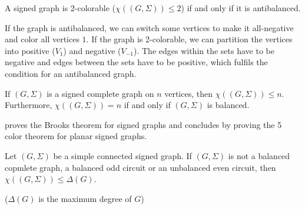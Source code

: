 \begin{proposition}[Máčajová et. al.]
    A signed graph is 2-colorable ($\chi ((G, \Sigma)) \leq 2$) if and only if it is antibalanced.
\end{proposition}

If the graph is antibalanced, we can switch some vertices to make it all-negative and color all vertices $1$.
If the graph is 2-colorable, we can partition the vertices into positive ($V_1$) and negative ($V_{-1}$).
The edges within the sets have to be negative and edges between the sets have to be positive, which fulfils the condition for an antibalanced graph.

\begin{proposition}
    If $(G, \Sigma)$ is a signed complete graph on $n$ vertices, then $\chi ((G, \Sigma)) \leq n$. 
    Furthermore, $\chi ((G, \Sigma)) = n$ if and only if $(G, \Sigma)$ is balanced.
\end{proposition}

\cite{chromatic-number} proves the Brooks theorem\cite{brooks} for signed graphs and concludes by proving the 5 color theorem for planar signed graphs.

\begin{theorem}
    Let $(G, \Sigma)$ be a simple connected signed graph. If $(G, \Sigma)$ is not a balanced copmlete graph,
    a balanced odd circuit or an unbalanced even circuit, then $\chi ((G, \Sigma)) \leq \Delta (G)$.
\end{theorem}

($\Delta (G)$ is the maximum degree of $G$)

